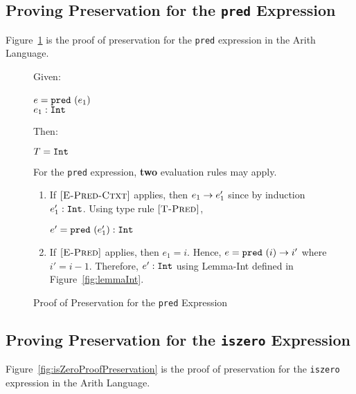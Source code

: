 \documentclass{report}
\newcommand{\rel}[1]{\mbox{\sc [#1]}}
\begin{document}
\subsection{Proving Preservation for the \texttt{pred} Expression}

Figure~\ref{fig:predProofPreservation} is the proof of preservation for the \texttt{pred} expression in the Arith Language.

\begin{figure}[ht!]
Given:
\begin{center}
   $e = \mbox{\tt pred}~(e_1)$~\\
   ${e_1} : {\mbox{\tt Int}}$
\end{center}
Then:
\begin{center}
   $T = \mbox{\tt Int}$
\end{center}
For the \texttt{pred} expression, \textbf{two} evaluation rules may apply.
\begin{enumerate}

    \item If $\rel{E-Pred-Ctxt}$ applies, then ${e_1} \rightarrow {e'_1}$ since by induction ${e'_1} : {\mbox{\tt Int}}$.  Using type rule $\rel{T-Pred}$,
    
    \begin{center}
      ${e' = \mbox{\tt pred}~(e'_1)} : {\mbox{\tt Int}}$
    \end{center}
      
    \item If $\rel{E-Pred}$ applies, then $e_1 = i$.  Hence, ${e = \mbox{\tt pred}~(i)} \rightarrow {i'}$ where $i' = i - 1$.  Therefore, ${e'} : {\mbox{\tt Int}}$ using Lemma-Int defined in Figure~\ref{fig:lemmaInt}.
    
\end{enumerate}

  \caption{Proof of Preservation for the \texttt{pred} Expression}\label{fig:predProofPreservation}
\end{figure} 

\subsection{Proving Preservation for the \texttt{iszero} Expression}

Figure~\ref{fig:isZeroProofPreservation} is the proof of preservation for the \texttt{iszero} expression in the Arith Language.
\end{document}
